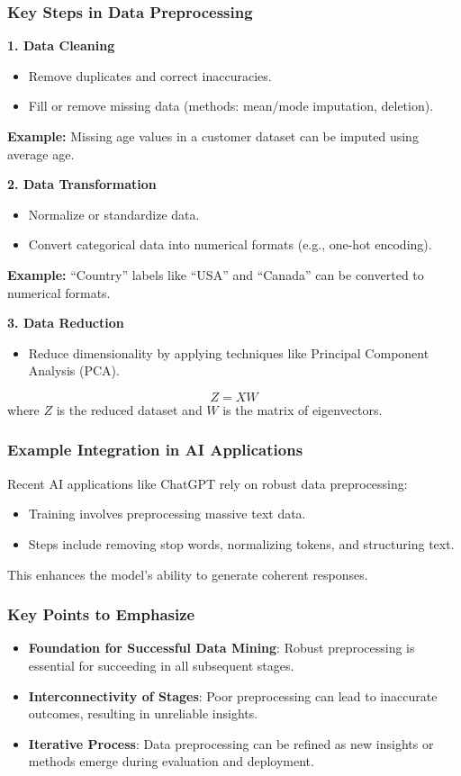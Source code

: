 \documentclass[aspectratio=169]{beamer}
\begin{document}
\begin{frame}[fragile]
    \frametitle{Key Steps in Data Preprocessing}
    \textbf{1. Data Cleaning}
    \begin{itemize}
        \item Remove duplicates and correct inaccuracies.
        \item Fill or remove missing data (methods: mean/mode imputation, deletion).
    \end{itemize}
    \textbf{Example:} Missing age values in a customer dataset can be imputed using average age.

    \textbf{2. Data Transformation}
    \begin{itemize}
        \item Normalize or standardize data.
        \item Convert categorical data into numerical formats (e.g., one-hot encoding).
    \end{itemize}
    \textbf{Example:} “Country” labels like “USA” and “Canada” can be converted to numerical formats.

    \textbf{3. Data Reduction}
    \begin{itemize}
        \item Reduce dimensionality by applying techniques like Principal Component Analysis (PCA).
    \end{itemize}
    \begin{equation}
        Z = XW
    \end{equation}
    where \( Z \) is the reduced dataset and \( W \) is the matrix of eigenvectors.
\end{frame}

\begin{frame}[fragile]
    \frametitle{Example Integration in AI Applications}
    Recent AI applications like ChatGPT rely on robust data preprocessing:
    \begin{itemize}
        \item Training involves preprocessing massive text data.
        \item Steps include removing stop words, normalizing tokens, and structuring text.
    \end{itemize}
    This enhances the model's ability to generate coherent responses.
\end{frame}

\begin{frame}[fragile]
    \frametitle{Key Points to Emphasize}
    \begin{itemize}
        \item \textbf{Foundation for Successful Data Mining}: Robust preprocessing is essential for succeeding in all subsequent stages.
        \item \textbf{Interconnectivity of Stages}: Poor preprocessing can lead to inaccurate outcomes, resulting in unreliable insights.
        \item \textbf{Iterative Process}: Data preprocessing can be refined as new insights or methods emerge during evaluation and deployment.
    \end{itemize}
\end{frame}
\end{document}
